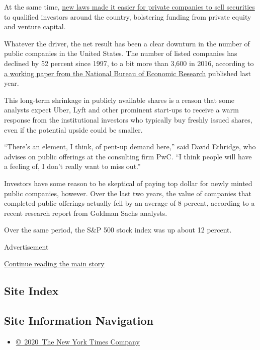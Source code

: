 At the same time,
\href{https://papers.ssrn.com/sol3/papers.cfm?abstract_id=3017610}{new
laws made it easier for private companies to sell securities} to
qualified investors around the country, bolstering funding from private
equity and venture capital.

Whatever the driver, the net result has been a clear downturn in the
number of public companies in the United States. The number of listed
companies has declined by 52 percent since 1997, to a bit more than
3,600 in 2016, according to \href{https://www.nber.org/papers/w24265}{a
working paper from the National Bureau of Economic Research} published
last year.

This long-term shrinkage in publicly available shares is a reason that
some analysts expect Uber, Lyft and other prominent start-ups to receive
a warm response from the institutional investors who typically buy
freshly issued shares, even if the potential upside could be smaller.

``There's an element, I think, of pent-up demand here,'' said David
Ethridge, who advises on public offerings at the consulting firm PwC.
``I think people will have a feeling of, I don't really want to miss
out.''

Investors have some reason to be skeptical of paying top dollar for
newly minted public companies, however. Over the last two years, the
value of companies that completed public offerings actually fell by an
average of 8 percent, according to a recent research report from Goldman
Sachs analysts.

Over the same period, the S\&P 500 stock index was up about 12 percent.

Advertisement

\protect\hyperlink{after-bottom}{Continue reading the main story}

\hypertarget{site-index}{%
\subsection{Site Index}\label{site-index}}

\hypertarget{site-information-navigation}{%
\subsection{Site Information
Navigation}\label{site-information-navigation}}

\begin{itemize}
\tightlist
\item
  \href{https://help.nytimes3xbfgragh.onion/hc/en-us/articles/115014792127-Copyright-notice}{©~2020~The
  New York Times Company}
\end{itemize}

